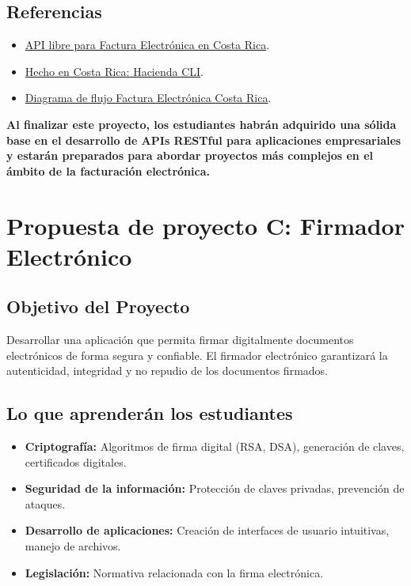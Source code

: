 \documentclass[
]{agujournal2019}
\begin{document}
\subsection{Referencias}\label{referencias-1}

\begin{itemize}
\item
  \href{https://github.com/CRLibre/API_Hacienda}{API libre para Factura
  Electrónica en Costa Rica}.
\item
  \href{https://medium.com/@kevinah95/hecho-en-costa-rica-hacienda-cli-d922490d6aca}{Hecho
  en Costa Rica: Hacienda CLI}.
\item
  \href{https://raw.githubusercontent.com/CRLibre/docs-fe-hacienda-cr/master/diagrama-flujo/Diagrama\%20de\%20Flujo\%20para\%20Factura\%20Electronica\%20Costa\%20Rica.png}{Diagrama
  de flujo Factura Electrónica Costa Rica}.
\end{itemize}

\textbf{Al finalizar este proyecto, los estudiantes habrán adquirido una
sólida base en el desarrollo de APIs RESTful para aplicaciones
empresariales y estarán preparados para abordar proyectos más complejos
en el ámbito de la facturación electrónica.}

\section{Propuesta de proyecto C: Firmador
Electrónico}\label{propuesta-de-proyecto-c-firmador-electruxf3nico}

\subsection{Objetivo del Proyecto}\label{objetivo-del-proyecto}

Desarrollar una aplicación que permita firmar digitalmente documentos
electrónicos de forma segura y confiable. El firmador electrónico
garantizará la autenticidad, integridad y no repudio de los documentos
firmados.

\subsection{Lo que aprenderán los
estudiantes}\label{lo-que-aprenderuxe1n-los-estudiantes}

\begin{itemize}
\item
  \textbf{Criptografía:} Algoritmos de firma digital (RSA, DSA),
  generación de claves, certificados digitales.
\item
  \textbf{Seguridad de la información:} Protección de claves privadas,
  prevención de ataques.
\item
  \textbf{Desarrollo de aplicaciones:} Creación de interfaces de usuario
  intuitivas, manejo de archivos.
\item
  \textbf{Legislación:} Normativa relacionada con la firma electrónica.
\end{itemize}
\end{document}
